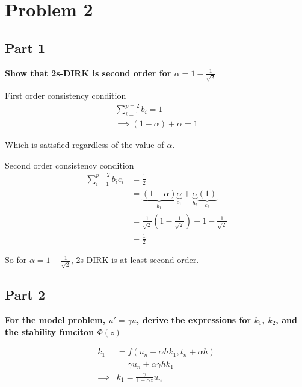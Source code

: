\documentclass{article}
\begin{document}
\section{Problem 2}%
\label{sec:problem_2}

\subsection{Part 1}%
\label{sub:part_1}

\textbf{Show that 2s-DIRK is second order for $ \alpha = 1- \frac{1}{ \sqrt{2}}$} 

\par First order consistency condition 
\begin{align*}
  \sum^{p=2}_{i=1} b_i = 1 \\
  \implies (1 - \alpha) + \alpha = 1
\end{align*}

Which is satisfied regardless of the value of $ \alpha$.
\vspace{15px}
\par Second order consistency condition
\begin{align*}
  \sum^{p=2}_{i=1} b_i c_i &= \frac{1}{2} \\
  &= \underbrace{(1- \alpha)}_{b_1} \underbrace{\alpha}_{c_1}
  + \underbrace{\alpha}_{b_2} \underbrace{(1)}_{c_2} \\
  &= \frac{1}{\sqrt{2}} \left(1 - \frac{1}{\sqrt{2}}\right)
  + 1 - \frac{1}{\sqrt{2}} \\
  &= \frac{1}{2}
\end{align*}

So for $ \alpha = 1 - \frac{1}{\sqrt{2}}$, 2s-DIRK is at least second order.

\subsection{Part 2}%
\label{sub:part_2}

\par \textbf{For the model problem, $u' = \gamma u$, derive the expressions for
$k_1$, $k_2$, and the stability funciton $\Phi(z)$} 

\begin{align*}
  k_1 &= f(u_n + \alpha h k_1, t_n + \alpha h ) \\
      &= \gamma u_n + \alpha \gamma h k_1 \\
  \implies &\boxed{k_1 = \frac{ \gamma}{1- \alpha z }u_n}
\end{align*}
\end{document}
